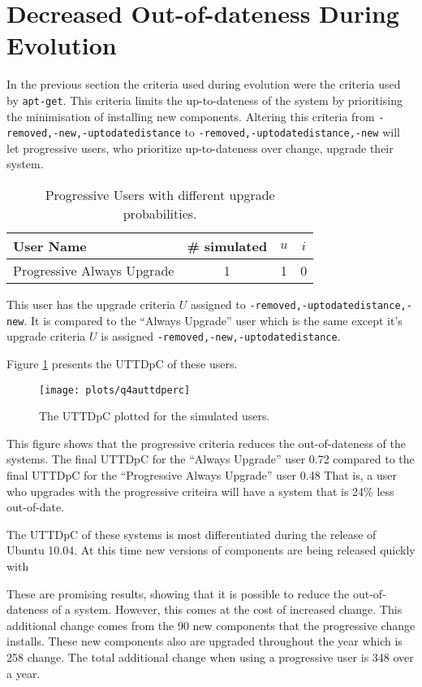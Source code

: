 \section{Decreased Out-of-dateness During Evolution}
\label{exp.prouttdsection}
In the previous section the criteria used during evolution were the criteria used by \texttt{apt-get}.
This criteria limits the up-to-dateness of the system by prioritising the minimisation of installing new components.
Altering this criteria from \texttt{-removed,-new,-uptodatedistance} to \texttt{-removed,-uptodatedistance,-new} 
will let progressive users, who prioritize up-to-dateness over change, upgrade their system.

\begin{table}[h!]
\centering
\begin{tabular}{|l | c | c | c |}
\hline
User Name 								& \# simulated 			& $u$ 		& $i$ 			\\ \hline
Progressive Always Upgrade				& 1 			 	& 1				& 0\\ \hline
\end{tabular}
\caption{Progressive Users with different upgrade probabilities.}
\label{exp.tblextremeusers}
\end{table}
This user has the upgrade criteria $U$ assigned to \texttt{-removed,-uptodatedistance,-new}.
It is compared to the ``Always Upgrade'' user which is the same except it's upgrade criteria $U$ is assigned \texttt{-removed,-new,-uptodatedistance}.

Figure \ref{exp.q4auttdperc} presents the UTTDpC of these users.
\begin{figure}[htp]
\begin{center}
  \texttt{[image: plots/q4auttdperc]}
  \caption{The UTTDpC plotted for the simulated users.}
  \label{exp.q4auttdperc}
\end{center}
\end{figure}

This figure shows that the progressive criteria reduces the out-of-dateness of the systems.
The final UTTDpC for the ``Always Upgrade'' user 0.72 compared to the final UTTDpC for the ``Progressive Always Upgrade'' user 0.48
That is, a user who upgrades with the progressive criteira will have a system that is 24\% less out-of-date.

The UTTDpC of these systems is most differentiated during the release of Ubuntu 10.04.
At this time new versions of components are being released quickly with   

These are promising results, showing that it is possible to reduce the out-of-dateness of a system.
However, this comes at the cost of increased change.
This additional change comes from the 90 new components that the progressive change installs.
These new components also are upgraded throughout the year which is 258 change.
The total additional change when using a progressive user is 348 over a year.  

